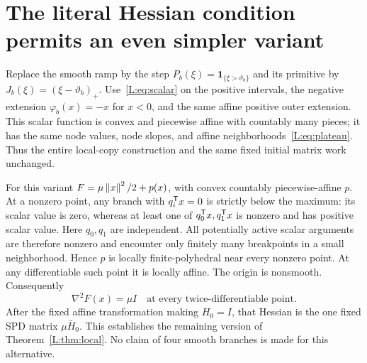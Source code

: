 \setcounter{section}{6}
\setcounter{theorem}{2}
\setcounter{lemma}{2}
\setcounter{corollary}{0}
\setcounter{proposition}{0}
\setcounter{remark}{0}
\setcounter{equation}{8}
\section{The literal Hessian condition permits an even simpler variant}
Replace the smooth ramp by the step $P_b(\xi)=\mathbf1_{\{\xi>\vartheta_b\}}$ and its primitive by $J_b(\xi)=(\xi-\vartheta_b)_+$. Use~\eqref{L:eq:scalar} on the positive intervals, the negative extension $\varphi_b(x)=-x$ for $x<0$, and the same affine positive outer extension. This scalar function is convex and piecewise affine with countably many pieces; it has the same node values, node slopes, and affine neighborhoods~\eqref{L:eq:plateau}. Thus the entire local-copy construction and the same fixed initial matrix work unchanged.

For this variant $F=\mu\left\lVert x\right\rVert^2/2+p(x)$, with convex countably piecewise-affine $p$. At a nonzero point, any branch with $q_i^{\mathsf T} x=0$ is strictly below the maximum: its scalar value is zero, whereas at least one of $q_0^{\mathsf T} x,q_1^{\mathsf T} x$ is nonzero and has positive scalar value. Here $q_0,q_1$ are independent. All potentially active scalar arguments are therefore nonzero and encounter only finitely many breakpoints in a small neighborhood. Hence $p$ is locally finite-polyhedral near every nonzero point. At any differentiable such point it is locally affine. The origin is nonsmooth. Consequently
\[
 \nabla^2F(x)=\mu I
 \quad\text{at every twice-differentiable point}.
\]
After the fixed affine transformation making $H_0=I$, that Hessian is the one fixed SPD matrix $\mu\bar H_0$. This establishes the remaining version of Theorem~\ref{L:thm:local}. No claim of four smooth branches is made for this alternative.


\endgroup
